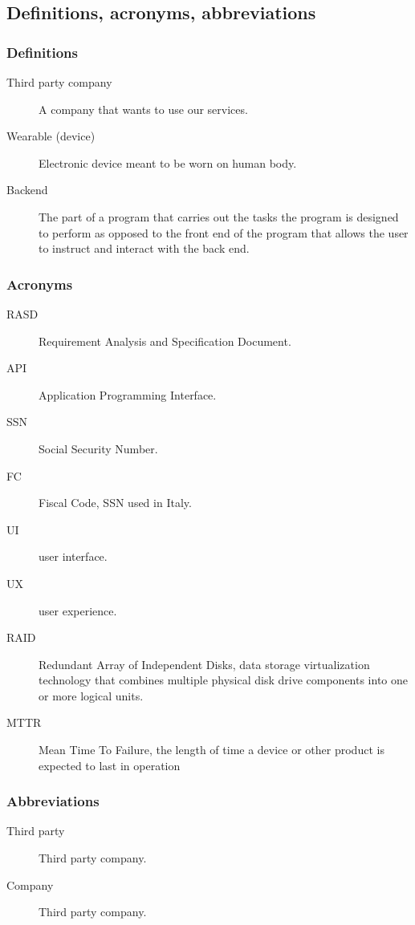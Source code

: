 \documentclass[../main.tex]{subfiles}
\begin{document}
\subsection{Definitions, acronyms, abbreviations}

\subsubsection{Definitions}
\begin{description}

	\item [Third party company] A company that wants to use our services.
	\item [Wearable (device)] Electronic device meant to be worn on human body.
	\item [Backend] The part of a program that carries out the tasks the program is designed to perform as opposed to the front end of the program that allows the user to instruct and interact with the back end.
	
\end{description}


\subsubsection{Acronyms}
\begin{description}

	\item [RASD] Requirement Analysis and Specification Document.
	\item [API] Application Programming Interface.
	\item [SSN] Social Security Number.
	\item [FC] Fiscal Code, SSN used in Italy.
	\item [UI] user interface.
	\item [UX] user experience.
	\item [RAID] Redundant Array of Independent Disks, data storage virtualization technology that combines multiple physical disk drive components into one or more logical units.
	\item [MTTR] Mean Time To Failure, the length of time a device or other product is expected to last in operation

\end{description}

\subsubsection{Abbreviations}
\begin{description}

	\item [Third party] Third party company.
	\item [Company] Third party company.

\end{description}
\end{document}
